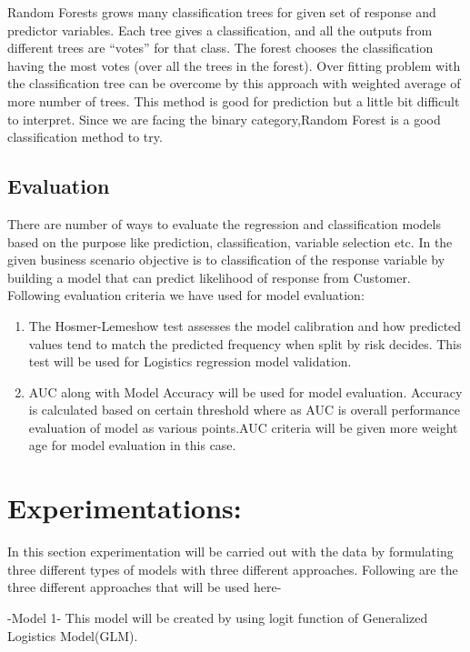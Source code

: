 \documentclass[english,floatsintext,man]{apa6}
\begin{document}
Random Forests grows many classification trees for given set of response
and predictor variables. Each tree gives a classification, and all the
outputs from different trees are \enquote{votes} for that class. The
forest chooses the classification having the most votes (over all the
trees in the forest). Over fitting problem with the classification tree
can be overcome by this approach with weighted average of more number of
trees. This method is good for prediction but a little bit difficult to
interpret. Since we are facing the binary category,Random Forest is a
good classification method to try.

\subsection{Evaluation}\label{evaluation}

There are number of ways to evaluate the regression and classification
models based on the purpose like prediction, classification, variable
selection etc. In the given business scenario objective is to
classification of the response variable by building a model that can
predict likelihood of response from Customer. Following evaluation
criteria we have used for model evaluation:

\begin{enumerate}
\def\labelenumi{(\arabic{enumi})}
\item
  The Hosmer-Lemeshow test assesses the model calibration and how
  predicted values tend to match the predicted frequency when split by
  risk decides. This test will be used for Logistics regression model
  validation.
\item
  AUC along with Model Accuracy will be used for model evaluation.
  Accuracy is calculated based on certain threshold where as AUC is
  overall performance evaluation of model as various points.AUC criteria
  will be given more weight age for model evaluation in this case.
\end{enumerate}

\section{Experimentations:}\label{experimentations}

In this section experimentation will be carried out with the data by
formulating three different types of models with three different
approaches. Following are the three different approaches that will be
used here-

-Model 1- This model will be created by using logit function of
Generalized Logistics Model(GLM).
\end{document}
